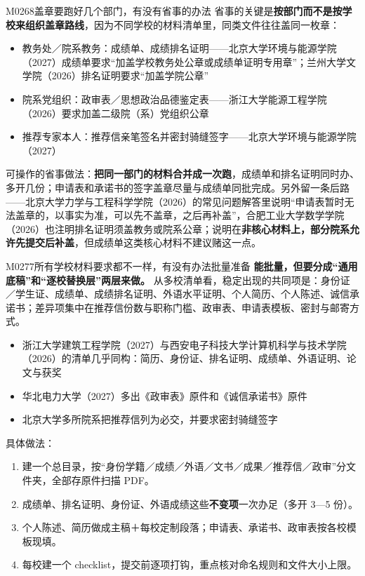 \begin{qa}{M0268}{盖章要跑好几个部门，有没有省事的办法}
省事的关键是\textbf{按部门而不是按学校来组织盖章路线}，因为不同学校的材料清单里，同类文件往往盖同一枚章：

\begin{itemize}
  \item 教务处／院系教务：成绩单、成绩排名证明——北京大学环境与能源学院（2027）成绩单要求“加盖学校教务处公章或成绩单证明专用章”；兰州大学文学院（2026）排名证明要求“加盖学院公章”
  \item 院系党组织：政审表／思想政治品德鉴定表——浙江大学能源工程学院（2026）要求加盖二级院（系）党组织公章
  \item 推荐专家本人：推荐信亲笔签名并密封骑缝签字——北京大学环境与能源学院（2027）
\end{itemize}

可操作的省事做法：\textbf{把同一部门的材料合并成一次跑}，成绩单和排名证明同时办、多开几份；申请表和承诺书的签字盖章尽量与成绩单同批完成。另外留一条后路——北京大学力学与工程科学学院（2026）的常见问题解答里说明“申请表暂时无法盖章的，以事实为准，可以先不盖章，之后再补盖”，合肥工业大学数学学院（2026）也注明排名证明须盖教务或院系公章；说明在\textbf{非核心材料上，部分院系允许先提交后补盖}，但成绩单这类核心材料不建议赌这一点。
\end{qa}

\begin{qa}{M0277}{所有学校材料要求都不一样，有没有办法批量准备}
\textbf{能批量，但要分成“通用底稿”和“逐校替换层”两层来做。} 从多校清单看，稳定出现的共同项是：身份证／学生证、成绩单、成绩排名证明、外语水平证明、个人简历、个人陈述、诚信承诺书；差异项集中在推荐信份数与职称门槛、政审表、申请表模板、密封与邮寄方式。

\begin{itemize}
  \item 浙江大学建筑工程学院（2027）与西安电子科技大学计算机科学与技术学院（2026）的清单几乎同构：简历、身份证、排名证明、成绩单、外语证明、论文与获奖
  \item 华北电力大学（2027）多出《政审表》原件和《诚信承诺书》原件
  \item 北京大学多所院系把推荐信列为必交，并要求密封骑缝签字
\end{itemize}

具体做法：

\begin{enumerate}
  \item 建一个总目录，按“身份学籍／成绩／外语／文书／成果／推荐信／政审”分文件夹，全部存原件扫描 PDF。
  \item 成绩单、排名证明、身份证、外语成绩这些\textbf{不变项}一次办足（多开 3—5 份）。
  \item 个人陈述、简历做成主稿＋每校定制段落；申请表、承诺书、政审表按各校模板现填。
  \item 每校建一个 checklist，提交前逐项打钩，重点核对命名规则和文件大小上限。
\end{enumerate}
\end{qa}

